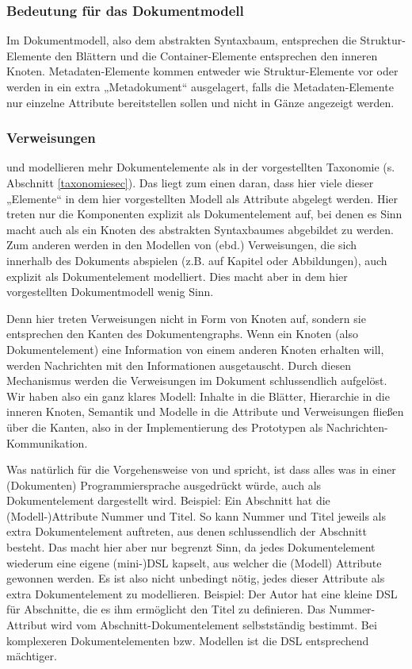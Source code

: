  
\subsubsection{Bedeutung für das Dokumentmodell}\label{}

 
Im Dokumentmodell, also dem abstrakten Syntaxbaum, entsprechen die Struktur-Elemente den Blättern und die Container-Elemente entsprechen den inneren Knoten. Metadaten-Elemente kommen entweder wie Struktur-Elemente vor oder werden in ein extra „Metadokument“ ausgelagert, falls die Metadaten-Elemente nur einzelne Attribute bereitstellen sollen und nicht in Gänze angezeigt werden.

 
\subsubsection{Verweisungen}\label{}

 
\citep{Peroni} und \citep{NISO} modellieren mehr Dokumentelemente als in der vorgestellten Taxonomie (s. Abschnitt \ref{taxonomiesec}). Das liegt zum einen daran, dass hier viele dieser „Elemente“ in dem hier vorgestellten Modell als Attribute abgelegt werden. Hier treten nur die Komponenten explizit als Dokumentelement auf, bei denen es Sinn macht auch als ein Knoten des abstrakten Syntaxbaumes abgebildet zu werden. Zum anderen werden in den Modellen von (ebd.) Verweisungen, die sich innerhalb des Dokuments abspielen (z.B. auf Kapitel oder Abbildungen), auch explizit als Dokumentelement modelliert. Dies macht aber in dem hier vorgestellten Dokumentmodell wenig Sinn.

 
Denn hier treten Verweisungen nicht in Form von Knoten auf, sondern sie entsprechen den Kanten des Dokumentengraphs. Wenn ein Knoten (also Dokumentelement) eine Information von einem anderen Knoten erhalten will, werden Nachrichten mit den Informationen ausgetauscht. Durch diesen Mechanismus werden die Verweisungen im Dokument schlussendlich aufgelöst. Wir haben also ein ganz klares Modell: Inhalte in die Blätter, Hierarchie in die inneren Knoten, Semantik und Modelle in die Attribute und Verweisungen fließen über die Kanten, also in der Implementierung des Prototypen als Nachrichten-Kommunikation.

 
Was natürlich für die Vorgehensweise von \citep{Peroni} und \citep{NISO} spricht, ist dass alles was in einer (Dokumenten) Programmiersprache ausgedrückt würde, auch als Dokumentelement dargestellt wird. Beispiel: Ein Abschnitt hat die (Modell-)Attribute Nummer und Titel. So kann Nummer und Titel jeweils als extra Dokumentelement auftreten, aus denen schlussendlich der Abschnitt besteht. Das macht hier aber nur begrenzt Sinn, da jedes Dokumentelement wiederum eine eigene (mini-)DSL kapselt, aus welcher die (Modell) Attribute gewonnen werden. Es ist also nicht unbedingt nötig, jedes dieser Attribute als extra Dokumentelement zu modellieren. Beispiel: Der Autor hat eine kleine DSL für Abschnitte, die es ihm ermöglicht den Titel zu definieren. Das Nummer-Attribut wird vom Abschnitt-Dokumentelement selbstständig bestimmt. Bei komplexeren Dokumentelementen bzw. Modellen ist die DSL entsprechend mächtiger.

